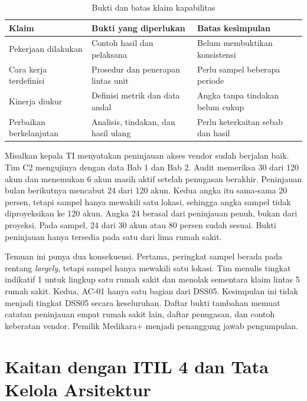 \begin{table}[!htb]
  \centering\small
  \caption{Bukti dan batas klaim kapabilitas}\label{tab:ch04-kapabilitas}
  \begin{tabularx}{\textwidth}{|>{\raggedright\arraybackslash}p{}|>{\raggedright\arraybackslash}X|>{\raggedright\arraybackslash}X|}
    \hline
    \textbf{Klaim} & \textbf{Bukti yang diperlukan} & \textbf{Batas kesimpulan} \\ \hline
    Pekerjaan dilakukan & Contoh hasil dan pelaksana & Belum membuktikan konsistensi \\ \hline
    Cara kerja terdefinisi & Prosedur dan penerapan lintas unit & Perlu sampel beberapa periode \\ \hline
    Kinerja diukur & Definisi metrik dan data andal & Angka tanpa tindakan belum cukup \\ \hline
    Perbaikan berkelanjutan & Analisis, tindakan, dan hasil ulang & Perlu keterkaitan sebab dan hasil \\ \hline
  \end{tabularx}
\end{table}

\begin{kasus}[title={Kasus Medikara Health: Potret Cepat DSS05 Lewat AC-01}]
Misalkan kepala TI menyatakan peninjauan akses vendor sudah berjalan baik. Tim C2 mengujinya dengan data Bab 1 dan Bab 2. Audit memeriksa 30 dari 120 akun dan menemukan 6
akun masih aktif setelah penugasan berakhir. Peninjauan bulan berikutnya mencabut 24 dari 120 akun. Kedua angka itu sama-sama 20 persen, tetapi sampel hanya mewakili satu lokasi,
sehingga angka sampel tidak diproyeksikan ke 120 akun. Angka 24 berasal dari peninjauan penuh, bukan dari proyeksi. Pada sampel, 24 dari 30 akun atau 80 persen sudah sesuai. Bukti peninjauan hanya tersedia pada satu dari lima rumah sakit.

Temuan ini punya dua konsekuensi. Pertama, peringkat sampel berada pada rentang \textit{largely}, tetapi sampel hanya mewakili satu lokasi. Tim menulis tingkat indikatif 1
untuk lingkup satu rumah sakit dan menolak sementara klaim lintas 5 rumah sakit. Kedua, AC-01 hanya satu bagian dari DSS05. Kesimpulan ini tidak menjadi tingkat DSS05 secara
keseluruhan. Daftar bukti tambahan memuat catatan peninjauan empat rumah sakit lain, daftar penugasan, dan contoh keberatan vendor. Pemilik Medikara+ menjadi penanggung
jawab pengumpulan.
\end{kasus}

\section{Kaitan dengan ITIL 4 dan Tata Kelola Arsitektur}

